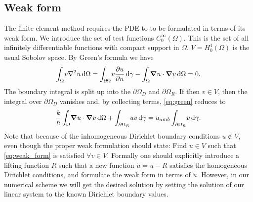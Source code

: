 \subsection{Weak form}
The finite element method requires the PDE to to be formulated in terms of its weak form. We introduce the set of test functions $C_0^\infty(\Omega)$. This is the set of all infinitely differentiable functions with compact support in $\Omega$. $V = H_0^1(\Omega)$ is the usual Sobolov space. By Green's formula we have
\begin{equation}
	\int_\Omega \! v\laplacian{u} \, \mathrm{d}\Omega = \int_{\partial\Omega} \! v\pdv{u}{n} \, \mathrm{d}\gamma -  \int_\Omega \! \grad{u}\cdot\grad{v} \, \mathrm{d}\Omega = 0
	\label{eq:green}.
\end{equation}
The boundary integral is split up into the $\partial\Omega_D$ and $\partial\Omega_R$. If then $v \in V$, then the integral over $\partial\Omega_D$ vanishes and, by collecting terms, \eqref{eq:green} reduces to 
\begin{equation}
	\frac{k}{h}\int_\Omega \! \grad{u}\cdot\grad{v} \, \mathrm{d}\Omega + \int_{\partial\Omega_R} \! uv\, \mathrm{d}\gamma = u_{amb}\int_{\partial\Omega_R} \! v \, \mathrm{d}\gamma.
	\label{eq:weak_form}
\end{equation}
Note that because of the inhomogeneous Dirichlet boundary conditions $u \notin V$, even though the proper weak formulation should state: Find $u \in V$ such that \eqref{eq:weak_form} is satisfied $\forall v \in V$. Formally one should explicitly introduce a lifting function $R$ such that a new function $\mathring{u} = u - R$ satisfies the homogeneous Dirichlet conditions, and formulate the weak form in terms of $\mathring{u}$. However, in our numerical scheme we will get the desired solution by setting the solution of our linear system to the known Dirichlet boundary values.


